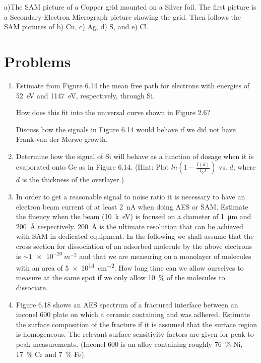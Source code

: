            a)The SAM picture of a Copper grid
          mounted on a Silver foil. The first picture is  a  Secondary
          Electron Micrograph picture showing the  grid.  Then  follows
          the SAM pictures of b) Cu, c) Ag, d) S, and e) Cl. 

               \newpage

\section{Problems}
\begin{enumerate}
\item Estimate from Figure 6.14 the mean free path for electrons with energies of \SI{52}{\electronvolt} and \SI{1147}{\electronvolt}, respectively, through Si.

How does this fit into the universal curve shown in Figure 2.6?

Discuss how the signals in Figure 6.14 would behave if we did not have Frank-van der Merwe growth.

\item Determine how the signal of Si will behave as a function of dosage when it is evaporated onto Ge as in Figure 6.14. (Hint: Plot $ln(1-\frac{I(d)}{I_0\lambda})$ vs. $d$, where $d$ is the thickness of the overlayer.)

\item In order to get a reasonable signal to noise ratio it is necessary to have an electron beam current of at least \SI{2}{nA} when doing AES or SAM. Estimate the fluency when the beam (\SI{10}{k\electronvolt}) is focused on a diameter of \SI{1}{\micro m} and \SI{200}{\angstrom} respectively. \SI{200}{\angstrom} is the ultimate resolution that can be achieved with SAM in dedicated equipment. In the following we shall assume that the cross section for dissociation of an adsorbed molecule by the above electrons is $\sim \SI{1e-20}{m^{-2}}$ and that we are measuring on a monolayer of molecules with an area of \SI{5e14}{cm^{-2}}. How long time can we allow ourselves to measure at the same spot if we only allow \SI{10}{\percent} of the molecules to dissociate.

\item Figure 6.18 shows an AES spectrum of a fractured interface between an inconel 600 plate on which a ceramic containing  and  was adhered. Estimate the surface composition of the fracture if it is assumed that the surface region is homogeneous. The relevant surface sensitivity factors are given for peak to peak measurements. (Inconel 600 is an alloy containing roughly \SI{76}{\percent} Ni, \SI{17}{\percent} Cr and \SI{7}{\percent} Fe).
                       \newpage

                       \vspace*{13cm}

\end{enumerate}


